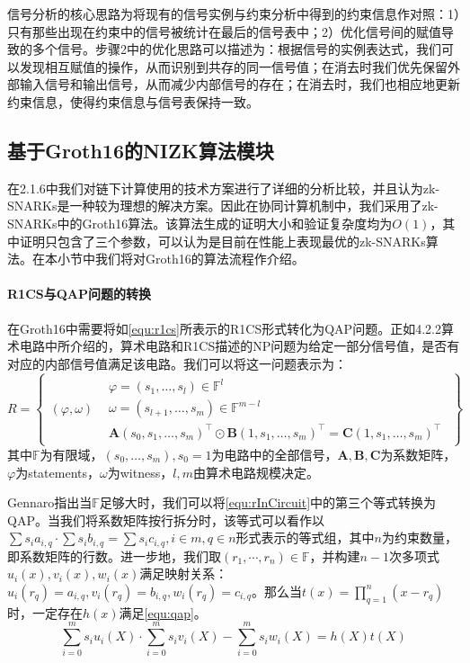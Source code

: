 \begin{enumerate}
    信号分析的核心思路为将现有的信号实例与约束分析中得到的约束信息作对照：1）只有那些出现在约束中的信号被统计在最后的信号表中；2）优化信号间的赋值导致的多个信号。步骤2中的优化思路可以描述为：根据信号的实例表达式，我们可以发现相互赋值的操作，从而识别到共存的同一信号值；在消去时我们优先保留外部输入信号和输出信号，从而减少内部信号的存在；在消去时，我们也相应地更新约束信息，使得约束信息与信号表保持一致。
\end{enumerate}

\subsection{基于Groth16的NIZK算法模块}
在2.1.6中我们对链下计算使用的技术方案进行了详细的分析比较，并且认为zk-SNARKs是一种较为理想的解决方案。因此在协同计算机制中，我们采用了zk-SNARKs中的Groth16算法\cite{cryptoeprint:2016/260}。该算法生成的证明大小和验证复杂度均为$O(1)$，其中证明只包含了三个参数，可以认为是目前在性能上表现最优的zk-SNARKs算法。在本小节中我们将对Groth16的算法流程作介绍。
\paragraph{R1CS与QAP问题的转换}
在Groth16中需要将如\autoref{equ:r1cs}所表示的R1CS形式转化为QAP问题。正如4.2.2算术电路中所介绍的，算术电路和R1CS描述的NP问题为给定一部分信号值，是否有对应的内部信号值满足该电路。我们可以将这一问题表示为：
\begin{equation}
    \label{equ:rInCircuit}
    R = \left \{ \begin{array}{c|l}
        (\varphi, \omega) 
        & \begin{array}{l}
            \varphi = (s_1, \dots, s_l) \in \mathbb{F}^l \\ 
            \omega = (s_{l+1}, \dots, s_m) \in \mathbb{F}^{m-l} \\
            \mathbf{A}(s_0, s_1, \dots, s_m)^\top \odot \mathbf{B}(1, s_1, \dots, s_m)^\top = \mathbf{C}(1, s_1, \dots, s_m)^\top
        \end{array}
    \end{array} \right \}
\end{equation}
其中$\mathbb{F}$为有限域，$(s_0, \dots, s_m), s_0 = 1$为电路中的全部信号，$\mathbf{A}, \mathbf{B}, \mathbf{C}$为系数矩阵，$\varphi$为statements，$\omega$为witness，$l, m$由算术电路规模决定。

Gennaro\cite{gennaro2013quadratic}指出当$\mathbb{F}$足够大时，我们可以将\autoref{equ:rInCircuit}中的第三个等式转换为QAP。当我们将系数矩阵按行拆分时，该等式可以看作以$\sum s_i a_{i,q} \cdot \sum s_i b_{i, q} = \sum s_i c_{i, q}, i \in m, q \in n$形式表示的等式组，其中$n$为约束数量，即系数矩阵的行数。进一步地，我们取$(r_1, \cdots, r_n) \in \mathbb{F}$，并构建$n-1$次多项式$u_i(x), v_i(x), w_i(x)$满足映射关系：$u_i(r_q) = a_{i, q}, v_i(r_q) = b_{i, q}, w_i(r_q) = c_{i, q}$。那么当$t(x) = \prod\limits_{q=1}^n(x-r_q)$时，一定存在$h(x)$满足\autoref{equ:qap}。
\begin{equation}
    \label{equ:qap}
    \sum\limits_{i=0}^m s_i u_i(X) \cdot \sum\limits_{i=0}^m s_i v_i(X) - \sum\limits_{i=0}^m s_i w_i(X) = h(X)t(X)
\end{equation}

